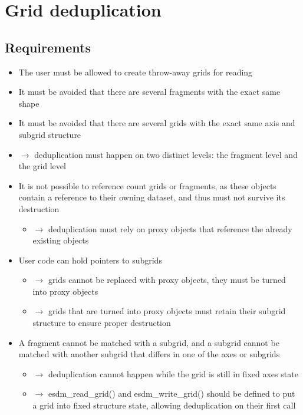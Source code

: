 \section{Grid deduplication}
\subsection{Requirements}

\begin{itemize}
  \item The user must be allowed to create throw-away grids for reading
  \item It must be avoided that there are several fragments with the exact same shape
  \item It must be avoided that there are several grids with the exact same axis and subgrid structure
  \item $\rightarrow$ deduplication must happen on two distinct levels: the fragment level and the grid level
  \item It is not possible to reference count grids or fragments, as these objects contain a reference to their owning dataset, and thus must not survive its destruction
    \begin{itemize}
      \item $\rightarrow$ deduplication must rely on proxy objects that reference the already existing objects
    \end{itemize}
  \item User code can hold pointers to subgrids
    \begin{itemize}
      \item $\rightarrow$ grids cannot be replaced with proxy objects, they must be turned into proxy objects
      \item $\rightarrow$ grids that are turned into proxy objects must retain their subgrid structure to ensure proper destruction
    \end{itemize}
  \item A fragment cannot be matched with a subgrid, and a subgrid cannot be matched with another subgrid that differs in one of the axes or subgrids
    \begin{itemize}
      \item $\rightarrow$ deduplication cannot happen while the grid is still in fixed axes state
      \item $\rightarrow$ esdm\_read\_grid() and esdm\_write\_grid() should be defined to put a grid into fixed structure state, allowing deduplication on their first call
    \end{itemize}
\end{itemize}



